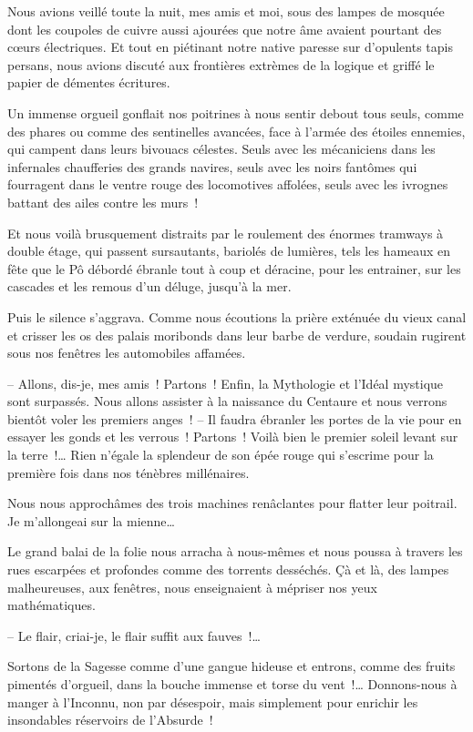 \documentclass[french,twoside]{book} %
\begin{document}
\noindent Nous avions veillé toute la nuit, mes amis et moi, sous des lampes de mosquée dont les coupoles de cuivre aussi ajourées que notre âme avaient pourtant des cœurs électriques. Et tout en piétinant notre native paresse sur d’opulents tapis persans, nous avions discuté aux frontières extrèmes de la logique et griffé le papier de démentes écritures.\par
Un immense orgueil gonflait nos poitrines à nous sentir debout tous seuls, comme des phares ou comme des sentinelles avancées, face à l’armée des étoiles ennemies, qui campent dans leurs bivouacs célestes. Seuls avec les mécaniciens dans les infernales chaufferies des grands navires, seuls avec les noirs fantômes qui fourragent dans le ventre rouge des locomotives affolées, seuls avec les ivrognes battant des ailes contre les murs !\par
Et nous voilà brusquement distraits par le roulement des énormes tramways à double étage, qui passent sursautants, bariolés de lumières, tels les hameaux en fête que le Pô débordé ébranle tout à coup et déracine, pour les entrainer, sur les cascades et les remous d’un déluge, jusqu’à la mer.\par
Puis le silence s’aggrava. Comme nous écoutions la prière exténuée du vieux canal et crisser les os des palais moribonds dans leur barbe de verdure, soudain rugirent sous nos fenêtres les automobiles affamées.\par
– Allons, dis-je, mes amis ! Partons ! Enfin, la Mythologie et l’Idéal mystique sont surpassés. Nous allons assister à la naissance du Centaure et nous verrons bientôt voler les premiers anges ! – Il faudra ébranler les portes de la vie pour en essayer les gonds et les verrous ! Partons ! Voilà bien le premier soleil levant sur la terre !… Rien n’égale la splendeur de son épée rouge qui s’escrime pour la première fois dans nos ténèbres millénaires.\par
Nous nous approchâmes des trois machines renâclantes pour flatter leur poitrail. Je m’allongeai sur la mienne…\par
Le grand balai de la folie nous arracha à nous-mêmes et nous poussa à travers les rues escarpées et profondes comme des torrents desséchés. Çà et là, des lampes malheureuses, aux fenêtres, nous enseignaient à mépriser nos yeux mathématiques.\par
– Le flair, criai-je, le flair suffit aux fauves !…\par
Sortons de la Sagesse comme d’une gangue hideuse et entrons, comme des fruits pimentés d’orgueil, dans la bouche immense et torse du vent !… Donnons-nous à manger à l’Inconnu, non par désespoir, mais simplement pour enrichir les insondables réservoirs de l’Absurde !\par
\end{document}
